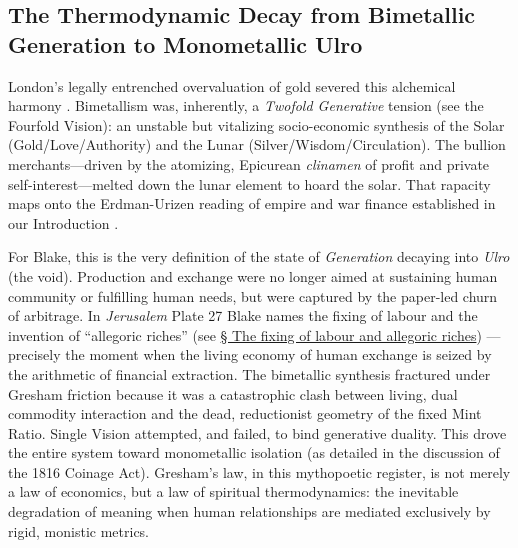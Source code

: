 \documentclass[
]{article}
\begin{document}
\subsection{The Thermodynamic Decay from Bimetallic Generation to
Monometallic
Ulro}\label{the-thermodynamic-decay-from-bimetallic-generation-to-monometallic-ulro}

London's legally entrenched overvaluation of gold severed this
alchemical harmony \citep{quinn1996competing}. Bimetallism was,
inherently, a \emph{Twofold Generative} tension (see the Fourfold
Vision): an unstable but vitalizing socio-economic synthesis of the
Solar (Gold/Love/Authority) and the Lunar (Silver/Wisdom/Circulation).
The bullion merchants---driven by the atomizing, Epicurean
\emph{clinamen} of profit and private self-interest---melted down the
lunar element to hoard the solar. That rapacity maps onto the
Erdman-Urizen reading of empire and war finance established in our
Introduction \citep{erdman1954prophet}.

For Blake, this is the very definition of the state of \emph{Generation}
decaying into \emph{Ulro} (the void). Production and exchange were no
longer aimed at sustaining human community or fulfilling human needs,
but were captured by the paper-led churn of arbitrage. In
\emph{Jerusalem} Plate 27 Blake names the fixing of labour and the
invention of ``allegoric riches'' (see \hyperref[sec-allegoric-riches]{§
The fixing of labour and allegoric riches})
\citep{erdman1988complete, sklar2011blake}---precisely the moment when
the living economy of human exchange is seized by the arithmetic of
financial extraction. The bimetallic synthesis fractured under Gresham
friction because it was a catastrophic clash between living, dual
commodity interaction and the dead, reductionist geometry of the fixed
Mint Ratio. Single Vision attempted, and failed, to bind generative
duality. This drove the entire system toward monometallic isolation (as
detailed in the discussion of the 1816 Coinage Act). Gresham's law, in
this mythopoetic register, is not merely a law of economics, but a law
of spiritual thermodynamics: the inevitable degradation of meaning when
human relationships are mediated exclusively by rigid, monistic metrics.
\end{document}
